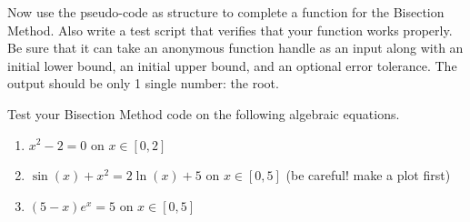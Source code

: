 \begin{problem}
    Now use the pseudo-code as structure to complete a \ProgLang function for the Bisection
    Method.  Also write a test script that verifies that your function works properly. Be
    sure that it can take an anonymous function handle as an input along with an initial
    lower bound, an initial upper bound, and an optional error tolerance. The output
    should be only 1 single number: the root.\\
    \ifnum{}  
    \else
    \fi
\end{problem}

\begin{problem}
    Test your Bisection Method code on the following algebraic equations.
    \begin{enumerate}
        \item $x^2 - 2 = 0$ on $x \in [0,2]$ 
        \item $\sin(x) + x^2 = 2\ln(x) + 5$ on $x \in [0,5]$ (be careful! make a plot
            first) 
        \item $(5-x)e^{x}=5$ on $x \in [0,5]$
    \end{enumerate}
\end{problem}


